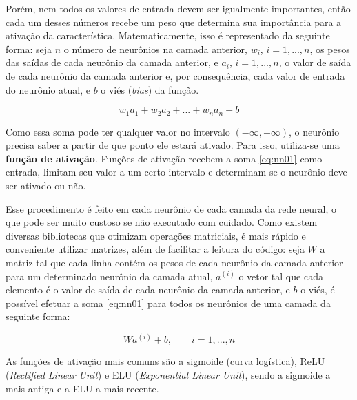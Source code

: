 Porém, nem todos os valores de entrada devem ser igualmente importantes, então cada um desses números recebe um peso que determina sua importância para a ativação da característica.
Matematicamente, isso é representado da seguinte forma:
seja $n$ o número de neurônios na camada anterior, $w_{i}$, $i = 1, ..., n$, os pesos das saídas de cada neurônio da camada anterior, e $a_{i}$, $i = 1, ..., n$, o valor de saída de cada neurônio da camada anterior e, por consequência, cada valor de entrada do neurônio atual, e $b$ o viés (\textit{bias}) da função.

\begin{equation} \label{eq:nn01}
w_{1}a_{1} + w_{2}a_{2} + ... + w_{n}a_{n} - b
\end{equation}

Como essa soma pode ter qualquer valor no intervalo $(-\infty, +\infty)$, o neurônio precisa saber a partir de que ponto ele estará ativado.
Para isso, utiliza-se uma \textbf{função de ativação}.
Funções de ativação recebem a soma \ref{eq:nn01} como entrada, limitam seu valor a um certo intervalo 
e determinam se o neurônio deve ser ativado ou não.

Esse procedimento é feito em cada neurônio de cada camada da rede neural, o que pode ser muito custoso se não executado com cuidado.
Como existem diversas bibliotecas que otimizam operações matriciais, é mais rápido e conveniente utilizar matrizes, além de facilitar a leitura do código:
seja $W$ a matriz tal que cada linha contém os pesos de cada neurônio da camada anterior para um determinado neurônio da camada atual, $a^{(i)}$ o vetor tal que cada elemento é o valor de saída de cada neurônio da camada anterior, e $b$ o viés, é possível efetuar a soma \ref{eq:nn01} para todos os neurônios de uma camada da seguinte forma:

\begin{equation} \label{eq:nn02}
Wa^{(i)} + b, \qquad i = 1, ..., n
\end{equation}

As funções de ativação mais comuns são a sigmoide (curva logística), ReLU (\textit{Rectified Linear Unit}) e ELU (\textit{Exponential Linear Unit}), sendo a sigmoide a mais antiga e a ELU a mais recente.


